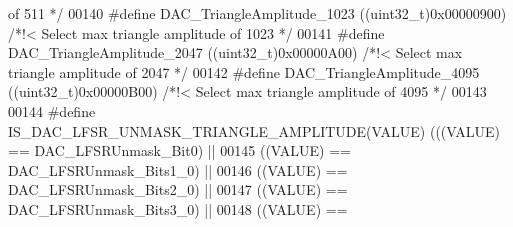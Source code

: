 \begin{DoxyCode}
{       of 511 */}
00140 \textcolor{preprocessor}{#}\textcolor{preprocessor}{define} \textcolor{preprocessor}{DAC\_TriangleAmplitude\_1023}         \textcolor{preprocessor}{(}\textcolor{preprocessor}{(}\textcolor{preprocessor}{uint32\_t}\textcolor{preprocessor}{)}0x00000900\textcolor{preprocessor}{)} \textcolor{comment}{/*!< Select max triangle amplitude
       of 1023 */}
00141 \textcolor{preprocessor}{#}\textcolor{preprocessor}{define} \textcolor{preprocessor}{DAC\_TriangleAmplitude\_2047}         \textcolor{preprocessor}{(}\textcolor{preprocessor}{(}\textcolor{preprocessor}{uint32\_t}\textcolor{preprocessor}{)}0x00000A00\textcolor{preprocessor}{)} \textcolor{comment}{/*!< Select max triangle amplitude
       of 2047 */}
00142 \textcolor{preprocessor}{#}\textcolor{preprocessor}{define} \textcolor{preprocessor}{DAC\_TriangleAmplitude\_4095}         \textcolor{preprocessor}{(}\textcolor{preprocessor}{(}\textcolor{preprocessor}{uint32\_t}\textcolor{preprocessor}{)}0x00000B00\textcolor{preprocessor}{)} \textcolor{comment}{/*!< Select max triangle amplitude
       of 4095 */}
00143 
00144 \textcolor{preprocessor}{#}\textcolor{preprocessor}{define} \textcolor{preprocessor}{IS\_DAC\_LFSR\_UNMASK\_TRIANGLE\_AMPLITUDE}\textcolor{preprocessor}{(}\textcolor{preprocessor}{VALUE}\textcolor{preprocessor}{)} \textcolor{preprocessor}{(}\textcolor{preprocessor}{(}\textcolor{preprocessor}{(}\textcolor{preprocessor}{VALUE}\textcolor{preprocessor}{)} \textcolor{preprocessor}{==} 
      DAC_LFSRUnmask_Bit0\textcolor{preprocessor}{)} \textcolor{preprocessor}{||}
00145                                                       \textcolor{preprocessor}{(}\textcolor{preprocessor}{(}\textcolor{preprocessor}{VALUE}\textcolor{preprocessor}{)} \textcolor{preprocessor}{==} 
      DAC_LFSRUnmask_Bits1_0\textcolor{preprocessor}{)} \textcolor{preprocessor}{||}
00146                                                       \textcolor{preprocessor}{(}\textcolor{preprocessor}{(}\textcolor{preprocessor}{VALUE}\textcolor{preprocessor}{)} \textcolor{preprocessor}{==} 
      DAC_LFSRUnmask_Bits2_0\textcolor{preprocessor}{)} \textcolor{preprocessor}{||}
00147                                                       \textcolor{preprocessor}{(}\textcolor{preprocessor}{(}\textcolor{preprocessor}{VALUE}\textcolor{preprocessor}{)} \textcolor{preprocessor}{==} 
      DAC_LFSRUnmask_Bits3_0\textcolor{preprocessor}{)} \textcolor{preprocessor}{||}
00148                                                       \textcolor{preprocessor}{(}\textcolor{preprocessor}{(}\textcolor{preprocessor}{VALUE}\textcolor{preprocessor}{)} \textcolor{preprocessor}{==} 

\end{DoxyCode}
